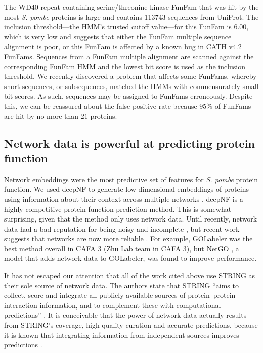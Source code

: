 The WD40 repeat-containing serine/threonine kinase FunFam that was hit by the most \emph{S. pombe} proteins is large and contains \num{113743} sequences from UniProt. The inclusion threshold---the HMM's trusted cutoff value---for this FunFam is $6.00$, which is very low and suggests that either the FunFam multiple sequence alignment is poor, or this FunFam is affected by a known bug in CATH v4.2 FunFams. Sequences from a FunFam multiple alignment are scanned against the corresponding FunFam HMM and the lowest bit score is used as the inclusion threshold. We recently discovered a problem that affects some FunFams, whereby short sequences, or subsequences, matched the HMMs with commensurately small bit scores. As such, sequences may be assigned to FunFams erroneously. Despite this, we can be reassured about the false positive rate because $95\%$ of FunFams are hit by no more than $21$ proteins.

\subsection{Network data is powerful at predicting protein function}

Network embeddings were the most predictive set of features for \emph{S. pombe} protein function. We used deepNF to generate low-dimensional embeddings of proteins using information about their context across multiple networks \cite{Gligorijevic2018}. deepNF is a highly competitive protein function prediction method. This is somewhat surprising, given that the method only uses network data. Until recently, network data had a bad reputation for being noisy and incomplete \cite{Sprinzak2003,DeSilva2006,Kuchaiev2009,Zaki2013}, but recent work suggests that networks are now more reliable \cite{Heriche2014,Lehtinen2015,Piovesan2015,Moya-Garcia2017,Gligorijevic2018,You2019}. For example, GOLabeler \cite{You2018} was the best method overall in CAFA 3 \cite{Zhou2019} (Zhu Lab team in CAFA 3), but NetGO \cite{You2019}, a model that adds network data to GOLabeler, was found to improve performance.

It has not escaped our attention that all of the work cited above use STRING \cite{Szklarczyk2019,Szklarczyk2015} as their sole source of network data. The authors state that STRING ``aims to collect, score and integrate all publicly available sources of protein--protein interaction information, and to complement these with computational predictions'' \cite{Szklarczyk2019}. It is conceivable that the power of network data actually results from STRING's coverage, high-quality curation and accurate predictions, because it is known that integrating information from independent sources improves predictions \cite{Lees2011}.

